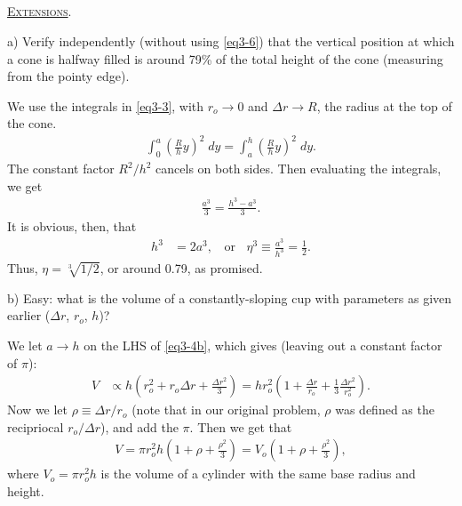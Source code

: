 \documentclass[11pt]{article}
\begin{document}
\subsection[Extensions]{} \textsc{\underline{Extensions}}.

\vspace{10pt} a) Verify independently (without using \eqref{eq3-6}) that the vertical position at which a cone is halfway filled is around 79\% of the total height of the cone (measuring from the pointy edge). 

\vspace{10pt} We use the integrals in \eqref{eq3-3}, with $r_o \rightarrow 0$ and $\Delta r \rightarrow R$, the radius at the top of the cone.
\begin{align} \label{eq3-7} 
\int_{0}^{a}{\left(\frac{R}{h} y \right)^2}\; dy = \int_{a}^{h}{\left(\frac{R}{h} y \right)^2}\; dy.
\end{align}
The constant factor $R^2/h^2$ cancels on both sides. Then evaluating the integrals, we get
\begin{align}
\frac{a^3}{3} = \frac{h^3 - a^3}{3}.
\end{align}
It is obvious, then, that
\begin{align}
h^3 &= 2a^3, \; \; \text{ or } \; \; \eta^3 \equiv \frac{a^3}{h^3} = \frac{1}{2}.
\end{align}
Thus, $\eta = \sqrt[3]{1/2}$, or around 0.79, as promised.

\vspace{10pt} b) Easy: what is the volume of a constantly-sloping cup with parameters as given earlier ($\Delta r$, $r_o$, $h$)?

\vspace{10pt} We let $a \rightarrow h$ on the LHS of \eqref{eq3-4b}, which gives (leaving out a constant factor of $\pi$):
\begin{align}
V &\propto h \left( r_o^2 + r_o \Delta r + \frac{\Delta r^2}{3} \right) = hr_o^2 \left( 1 + \frac{\Delta r}{r_o} + \frac{1}{3}\frac{\Delta r^2}{r_o^2} \right).
\end{align}
Now we let $\rho \equiv \Delta r / r_o$ (note that in our original problem, $\rho$ was defined as the recipriocal $r_o / \Delta r$), and add the $\pi$. Then we get that
\begin{align}
V = \pi r_o^2 h \left( 1 + \rho + \frac{\rho^2}{3} \right) = V_o \left( 1 + \rho + \frac{\rho^2}{3} \right),
\end{align}
where $V_o = \pi r_o^2 h$ is the volume of a cylinder with the same base radius and height. 
\end{document}
